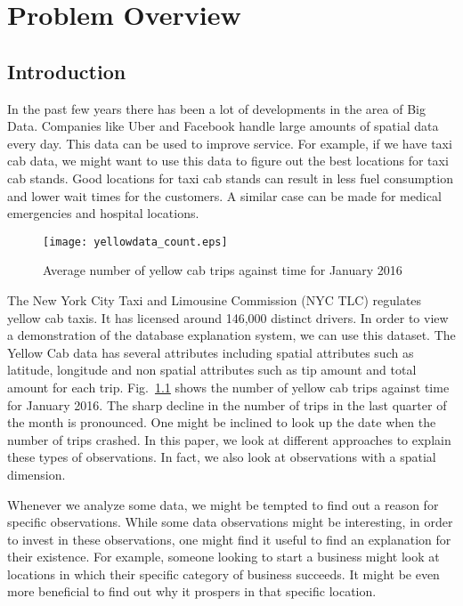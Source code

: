 \chapter{Problem Overview}


\label{sec:Intro}
\section{Introduction}

In the past few years there has been a lot of developments in the area of Big Data. Companies like Uber and Facebook handle large amounts of spatial data every day. This data can be used to improve service. For example, if we have taxi cab data, we might want to use this data to figure out the best locations for taxi cab stands. Good locations for taxi cab stands can result in less fuel consumption and lower wait times for the customers. A similar case can be made for medical emergencies and hospital locations.

\begin{figure}[ht]
\texttt{[image: yellowdata\_count.eps]}
\caption{Average number of yellow cab trips against time for January 2016}
\label{fig:yellowstats}
\end{figure}

The New York City Taxi and Limousine Commission (NYC TLC) regulates yellow cab taxis\citep{taxi2016tlc}. It has licensed around 146,000 distinct drivers. In order to view a demonstration of the database explanation system, we can use this dataset. The Yellow Cab data has several attributes including spatial attributes such as latitude, longitude and non spatial attributes such as tip amount and total amount for each trip. Fig.~\ref{fig:yellowstats} shows the number of yellow cab trips against time for January 2016. The sharp decline in the number of trips in the last quarter of the month is pronounced. One might be inclined to look up the date when the number of trips crashed. In this paper, we look at different approaches to explain these types of observations. In fact, we also look at observations with a spatial dimension.

Whenever we analyze some data, we might be tempted to find out a reason for specific observations. While some data observations might be interesting, in order to invest in these observations, one might find it useful to find an explanation for their existence. For example, someone looking to start a business might look at locations in which their specific category of business succeeds. It might be even more beneficial to find out why it prospers in that specific location.

